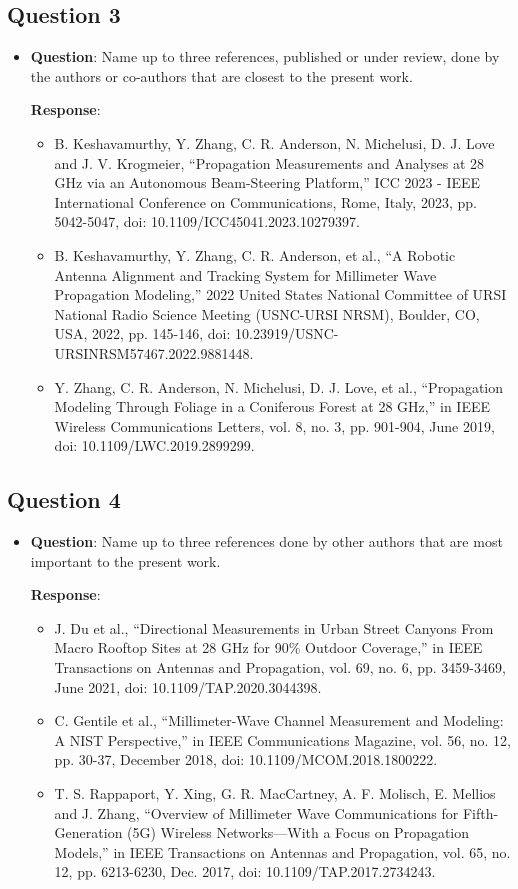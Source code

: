 \documentclass[12pt, draftcls, onecolumn]{IEEEtran}
\begin{document}
\subsection{Question 3}
\begin{itemize}
\item \textbf{Question}: Name up to three references, published or under review, done by the authors or co-authors that are closest to the present work.

\textbf{Response}:
\begin{itemize}
    \item B. Keshavamurthy, Y. Zhang, C. R. Anderson, N. Michelusi, D. J. Love and J. V. Krogmeier, ``Propagation Measurements and Analyses at 28 GHz via an Autonomous Beam-Steering Platform,'' ICC 2023 - IEEE International Conference on Communications, Rome, Italy, 2023, pp. 5042-5047, doi: 10.1109/ICC45041.2023.10279397.\label{1}
    \item B. Keshavamurthy, Y. Zhang, C. R. Anderson, et al., ``A Robotic Antenna Alignment and Tracking System for Millimeter Wave Propagation Modeling,'' 2022 United States National Committee of URSI National Radio Science Meeting (USNC-URSI NRSM), Boulder, CO, USA, 2022, pp. 145-146, doi: 10.23919/USNC-URSINRSM57467.2022.9881448.\label{2}
    \item Y. Zhang, C. R. Anderson, N. Michelusi, D. J. Love, et al., ``Propagation Modeling Through Foliage in a Coniferous Forest at 28 GHz,'' in IEEE Wireless Communications Letters, vol. 8, no. 3, pp. 901-904, June 2019, doi: 10.1109/LWC.2019.2899299.\label{3}
\end{itemize}
\end{itemize}

\subsection{Question 4}
\begin{itemize}
\item \textbf{Question}: Name up to three references done by other authors that are most important to the present work.

\textbf{Response}:
\begin{itemize}
    \item J. Du et al., ``Directional Measurements in Urban Street Canyons From Macro Rooftop Sites at 28 GHz for 90\% Outdoor Coverage,'' in IEEE Transactions on Antennas and Propagation, vol. 69, no. 6, pp. 3459-3469, June 2021, doi: 10.1109/TAP.2020.3044398.
    \item C. Gentile et al., ``Millimeter-Wave Channel Measurement and Modeling: A NIST Perspective,'' in IEEE Communications Magazine, vol. 56, no. 12, pp. 30-37, December 2018, doi: 10.1109/MCOM.2018.1800222.
    \item T. S. Rappaport, Y. Xing, G. R. MacCartney, A. F. Molisch, E. Mellios and J. Zhang, ``Overview of Millimeter Wave Communications for Fifth-Generation (5G) Wireless Networks—With a Focus on Propagation Models,'' in IEEE Transactions on Antennas and Propagation, vol. 65, no. 12, pp. 6213-6230, Dec. 2017, doi: 10.1109/TAP.2017.2734243.
\end{itemize}
\end{itemize}
\end{document}
